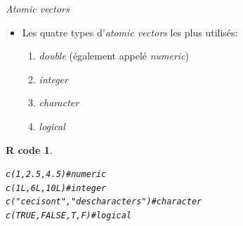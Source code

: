 \documentclass[11pt]{beamer}\usepackage[]{graphicx}\usepackage[]{color}
\makeatletter
\newcommand{\hlnum}[1]{\textcolor[rgb]{0.063,0.58,0.627}{#1}}%
\newcommand{\hlstr}[1]{\textcolor[rgb]{0.063,0.58,0.627}{#1}}%
\newcommand{\hlcom}[1]{\textcolor[rgb]{0.588,0.588,0.588}{#1}}%
\newcommand{\hlstd}[1]{\textcolor[rgb]{0.196,0.196,0.196}{#1}}%
\newcommand{\hlkwd}[1]{\textcolor[rgb]{0.78,0.227,0.412}{#1}}%
\newenvironment{kframe}{%
 \def\at@end@of@kframe{}%
 \ifinner\ifhmode%
  \def\at@end@of@kframe{\end{minipage}}%
  \begin{minipage}{\columnwidth}%
 \fi\fi%
 \def\FrameCommand##1{\hskip\@totalleftmargin \hskip-\fboxsep
 \colorbox{shadecolor}{##1}\hskip-\fboxsep
     \hskip-\linewidth \hskip-\@totalleftmargin \hskip\columnwidth}%
 \MakeFramed {\advance\hsize-\width
   \@totalleftmargin\z@ \linewidth\hsize
   \@setminipage}}%
 {\par\unskip\endMakeFramed%
 \at@end@of@kframe}
\newenvironment{knitrout}{}{} %
\newtheorem{rcode}{R code}[section]
\makeatother
\begin{document}
\begin{frame}[fragile]{\textit{Atomic vectors}}

\begin{itemize}
  \setlength\itemsep{2em}
\item Les quatre types d'\textit{atomic vectors} les plus utilisés: 
\begin{enumerate}
\item \textit{double} (également appelé \textit{numeric})
\item \textit{integer}
\item \textit{character}
\item \textit{logical}
\end{enumerate}
\end{itemize}
\pause
\begin{knitrout}
\color{fgcolor}\begin{kframe}
\begin{rcode}\label{unnamed-chunk-13}\begin{alltt}
\hlkwd{c}\hlstd{(}\hlnum{1}\hlstd{,} \hlnum{2.5}\hlstd{,} \hlnum{4.5}\hlstd{)} \hlcom{# numeric}
\hlkwd{c}\hlstd{(}\hlnum{1L}\hlstd{,} \hlnum{6L}\hlstd{,} \hlnum{10L}\hlstd{)} \hlcom{# integer}
\hlkwd{c}\hlstd{(}\hlstr{"ceci sont"}\hlstd{,} \hlstr{"des characters"}\hlstd{)} \hlcom{#character}
\hlkwd{c}\hlstd{(}\hlnum{TRUE}\hlstd{,} \hlnum{FALSE}\hlstd{, T, F)} \hlcom{# logical}
\end{alltt}
\end{rcode}\end{kframe}
\end{knitrout}

\end{frame}
\end{document}
